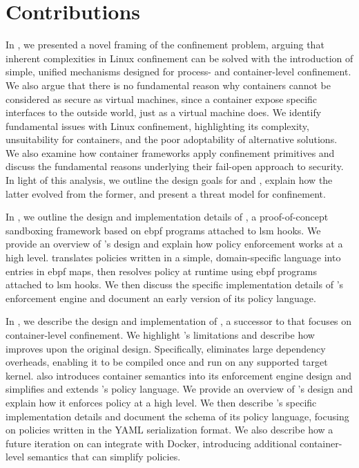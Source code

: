 \section{Contributions}%
\label{s:disc-contributions}

In , we presented a novel framing of the confinement problem,
arguing that inherent complexities in Linux confinement can be solved with the
introduction of simple, unified mechanisms designed for process- and container-level
confinement. We also argue that there is no fundamental reason why containers cannot be
considered as secure as virtual machines, since a container expose specific interfaces to
the outside world, just as a virtual machine does. We identify fundamental issues with
Linux confinement, highlighting its complexity, unsuitability for containers, and the poor
adoptability of alternative solutions. We also examine how container frameworks apply
confinement primitives and discuss the fundamental reasons underlying their fail-open
approach to security. In light of this analysis, we outline the design goals for \bpfbox{}
and \bpfcontain{}, explain how the latter evolved from the former, and present a threat
model for confinement.

In , we outline the design and implementation details of \bpfbox{},
a proof-of-concept sandboxing framework based on \gls{ebpf} programs attached to \gls{lsm}
hooks.  We provide an overview of \bpfbox{}'s design and explain how policy enforcement
works at a high level. \bpfbox{} translates policies written in a simple, domain-specific
language into entries in \gls{ebpf} maps, then resolves policy at runtime using \gls{ebpf}
programs attached to \gls{lsm} hooks. We then discuss the specific implementation details
of \bpfbox{}'s enforcement engine and document an early version of its policy language.

In , we describe the design and implementation of \bpfcontain{},
a successor to \bpfbox{} that focuses on container-level confinement. We highlight
\bpfbox{}'s limitations and describe how \bpfcontain{} improves upon the original
\bpfbox{} design. Specifically, \bpfcontain{} eliminates large dependency overheads,
enabling it to be compiled once and run on any supported target kernel. \bpfcontain{} also
introduces container semantics into its enforcement engine design and simplifies and
extends \bpfbox{}'s policy language. We provide an overview of \bpfcontain{}'s design and
explain how it enforces policy at a high level. We then describe \bpfcontain{}'s specific
implementation details and document the schema of its policy language, focusing on
policies written in the YAML serialization format.  We also describe how a future
iteration on \bpfcontain{} can integrate with Docker, introducing additional container-level
semantics that can simplify policies.

